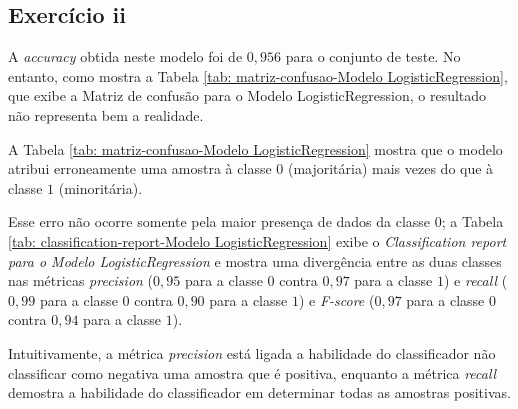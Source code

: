% 



\subsection{Exercício ii}

A \textit{accuracy} obtida neste modelo foi de $0,956$ para o conjunto de teste. No entanto, como mostra a Tabela \ref{tab: matriz-confusao-Modelo LogisticRegression}, que exibe a Matriz de confusão para o Modelo LogisticRegression, o resultado não representa bem a realidade.



A Tabela \ref{tab: matriz-confusao-Modelo LogisticRegression} mostra que o modelo atribui erroneamente uma amostra à classe $0$ (majoritária) mais vezes do que à classe $1$ (minoritária).

Esse erro não ocorre somente pela maior presença de dados da classe $0$; a Tabela \ref{tab: classification-report-Modelo LogisticRegression} exibe o \textit{Classification report para o Modelo LogisticRegression} e mostra uma divergência entre as duas classes nas métricas \textit{precision} ($0,95$ para a classe $0$ contra $0,97$ para a classe $1$) e \textit{recall} ($0,99$ para a classe $0$ contra $0,90$ para a classe $1$) e \textit{F-score} ($0,97$ para a classe $0$ contra $0,94$ para a classe $1$).



Intuitivamente, a métrica  \textit{precision} está ligada a habilidade do classificador não classificar como negativa uma amostra que é positiva, enquanto a métrica \textit{recall} demostra a habilidade do classificador em determinar todas as amostras positivas.

